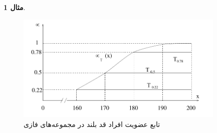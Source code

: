 \documentclass[12pt,a4paper]{article}
\theoremstyle{definition}
\newtheorem{exmp}{مثال}[section]
\begin{document}
\begin{exmp}
\cite{Bojadziev2007}
\begin{figure}[h]
\centering 
\includegraphics[width=100mm]{Images/Fig2.png}
\vspace{-0.5cm}
\caption{تابع عضویت افراد قد بلند در مجموعه‌‌های فازی}\label{fig:f_2}
\end{figure}
\end{exmp}
\end{document}
